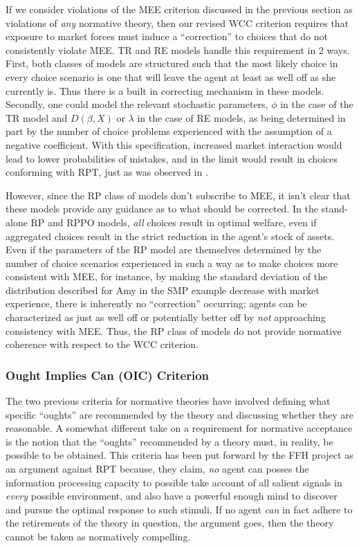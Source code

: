 If we consider violations of the MEE criterion discussed in the previous section as violations of \textit{any} normative theory, then our revised WCC criterion requires that exposure to market forces must induce a \enquote{correction} to choices that do not consistently violate MEE.
TR and RE models handle this requirement in 2 ways. 
First, both classes of models are structured such that the most likely choice in every choice scenario is one that will leave the agent at least as well off as she currently is.
Thus there is a built in correcting mechanism in these models.
Secondly, one could model the relevant stochastic parameters, $\phi$ in the case of the TR model and $D(\beta,X)$ or $\lambda$ in the case of RE models, as being determined in part by the number of choice problems experienced with the assumption of a negative coefficient.
With this specification, increased market interaction would lead to lower probabilities of mistakes, and in the limit would result in choices conforming with RPT, just as was observed in \textcite{Chu1990}.

However, since the RP class of models don't subscribe to MEE, it isn't clear that these models provide any guidance as to what should be corrected.
In the stand-alone RP and RPPO models, \textit{all} choices result in optimal welfare, even if aggregated choices result in the strict reduction in the agent's stock of assets.
Even if the parameters of the RP model are themselves determined by the number of choice scenarios experienced in such a way as to make choices more consistent with MEE, for instance, by making the standard deviation of the distribution described for Amy in the SMP example decrease with market experience, there is inherently no \enquote{correction} occurring;
agents can be characterized as just as well off or potentially better off by \textit{not} approaching consistency with MEE.
Thus, the RP class of models do not provide normative coherence with respect to the WCC criterion.

\subsubsection{Ought Implies Can (OIC) Criterion}

The two previous criteria for normative theories have involved defining what specific \enquote{oughts} are recommended by the theory and discussing whether they are reasonable.
A somewhat different take on a requirement for normative acceptance is the notion that the \enquote{oughts} recommended by a theory must, in reality, be possible to be obtained.
This criteria has been put forward by the FFH project as an argument against RPT because, they claim, \textit{no} agent can posses the information processing capacity to possible take account of all salient signals in \textit{every} possible environment, and also have a powerful enough mind to discover and pursue the optimal response to such stimuli.
If no agent \textit{can} in fact adhere to the retirements of the theory in question, the argument goes, then the theory cannot be taken as normatively compelling.

